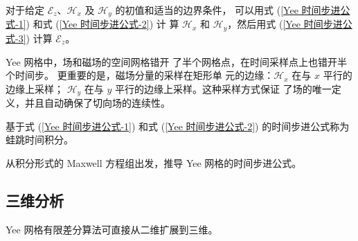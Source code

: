 \par 对于给定 $\mathscr{E}_z$、$\mathscr{H}_x$ 
及 $\mathscr{H}_y$ 的初值和适当的边界条件，
可以用式 (\ref{Yee 时间步进公式-1}) 和式 (\ref{Yee 时间步进公式-2}) 计
算 $\mathscr{H}_x$ 
和 $\mathscr{H}_y$，然后用式 (\ref{Yee 时间步进公式-3}) 计算
$\mathscr{E}_z$。

\begin{note}
    Yee 网格中，场和磁场的空间网格错开
    了半个网格点，在时间采样点上也错开半个时间步。
    更重要的是，磁场分量的采样在矩形单
    元的边缘：$\mathscr{H}_x$ 在与 $x$ 平行的边缘上采样；
    $\mathscr{H}_y$ 在与 $y$ 平行的边缘上采样。这种采样方式保证
    了场的唯一定义，并且自动确保了切向场的连续性。
\end{note}

\par 基于式 (\ref{Yee 时间步进公式-1})
和式 (\ref{Yee 时间步进公式-2}) 的时间步进公式称为蛙跳时间积分。

\begin{exercise}
    从积分形式的 Maxwell 方程组出发，推导 Yee 网格的时间步进公式。
\end{exercise}

\subsection{三维分析}

\par Yee 网格有限差分算法可直接从二维扩展到三维。

